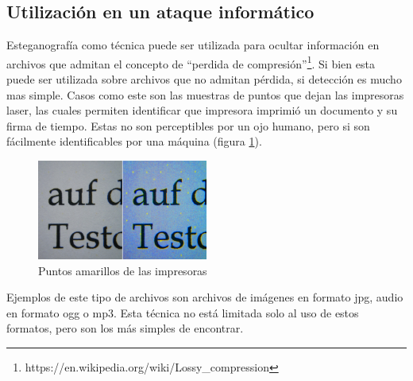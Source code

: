 \documentclass[11pt]{utalcaDoc}
\begin{document}
\subsection{ Utilización en un ataque informático }
Esteganografía como técnica puede ser utilizada para ocultar información en archivos que admitan el concepto de ``perdida de compresión''\footnote{https://en.wikipedia.org/wiki/Lossy_compression}. Si bien esta puede ser utilizada sobre archivos que no admitan pérdida, si detección es mucho mas simple. Casos como este son las muestras de puntos que dejan las impresoras laser, las cuales permiten identificar que impresora imprimió un documento y su firma de tiempo. Estas no son perceptibles por un ojo humano, pero si son fácilmente identificables por una máquina (figura \ref{PRINTER}).

\begin{figure}[]
    \centering
    \includegraphics[width=0.5\textwidth]{printer.png}
    \caption{Puntos amarillos de las impresoras}
    \label{PRINTER}
\end{figure}

Ejemplos de este tipo de archivos son archivos de imágenes en formato jpg, audio en formato ogg o mp3. Esta técnica no está limitada solo al uso de estos formatos, pero son los más simples de encontrar.

\end{document}

